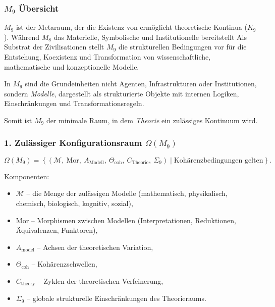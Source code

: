 

\subsubsection{\texorpdfstring{$M_9$}{M_9} Übersicht}
\label{sec:m9-overview}

$M_9$ ist der Metaraum, der die Existenz von ermöglicht
theoretische Kontinua ($K_9$).
Während $M_8$ das Materielle, Symbolische und Institutionelle bereitstellt
Als Substrat der Zivilisationen stellt $M_9$ die strukturellen Bedingungen vor
für die Entstehung, Koexistenz und Transformation von
wissenschaftliche, mathematische und konzeptionelle Modelle.

In $M_9$ sind die Grundeinheiten nicht Agenten, Infrastrukturen oder
Institutionen, sondern \emph{Modelle}, dargestellt als strukturierte Objekte
mit internen Logiken, Einschränkungen und Transformationsregeln.

Somit ist $M_9$ der minimale Raum, in dem \emph{Theorie} ein zulässiges Kontinuum wird.

\subsubsection*{1. Zulässiger Konfigurationsraum \texorpdfstring{$\Omega(M_9)$}{\Omega(M_9)}}

\[
\Omega(M_9)=
\left\{
(\mathcal{M},\ \mathrm{Mor},\ A_{\mathrm{Modell}},\
\Theta_{\mathrm{coh}},\ C_{\mathrm{Theorie}},\ \Sigma_9)
\mid \text{Kohärenzbedingungen gelten}
\right\}.
\]

Komponenten:

\begin{itemize}
    \item $\mathcal{M}$ – die Menge der zulässigen Modelle
        (mathematisch, physikalisch, chemisch, biologisch, kognitiv, sozial),
    \item $\mathrm{Mor}$ – Morphismen zwischen Modellen
        (Interpretationen, Reduktionen, Äquivalenzen, Funktoren),
    \item $A_{\mathrm{model}}$ – Achsen der theoretischen Variation,
    \item $\Theta_{\mathrm{coh}}$ – Kohärenzschwellen,
    \item $C_{\mathrm{theory}}$ – Zyklen der theoretischen Verfeinerung,
    \item $\Sigma_9$ – globale strukturelle Einschränkungen des Theorieraums.
\end{itemize}

